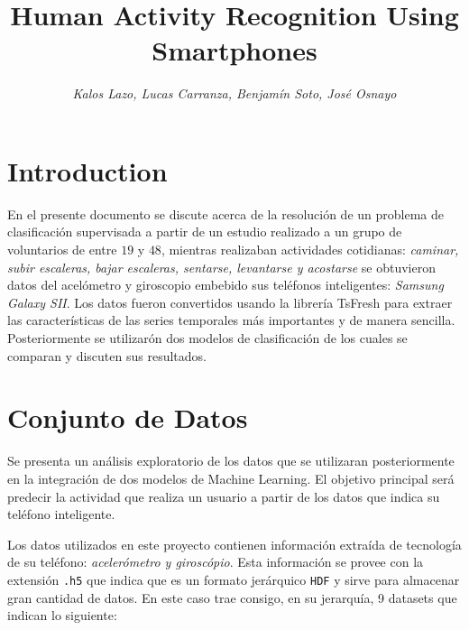 \documentclass[conference]{IEEEtran}
\begin{document}
    \title{Human Activity Recognition Using Smartphones\\}

    \author{\textit{Kalos Lazo, Lucas Carranza, Benjamín Soto, José Osnayo}}
\maketitle

\section{Introduction}
En el presente documento se discute acerca de la resolución de un problema de clasificación supervisada a partir de un estudio realizado a un grupo de voluntarios de entre $19$ y $48$, mientras realizaban actividades cotidianas: \textit{caminar, subir escaleras, bajar escaleras, sentarse, levantarse y acostarse} se obtuvieron datos del acelómetro y giroscopio embebido sus teléfonos inteligentes: \textit{Samsung Galaxy SII}. Los datos fueron convertidos usando la librería TsFresh para extraer las características de las series temporales más importantes y de manera sencilla. Posteriormente se utilizarón dos modelos de clasificación de los cuales se comparan y discuten sus resultados.

\section{Conjunto de Datos}
Se presenta un análisis exploratorio de los datos que se utilizaran posteriormente en la integración de dos modelos de Machine Learning. El objetivo principal será predecir la actividad que realiza un usuario a partir de los datos que indica su teléfono inteligente.

Los datos utilizados en este proyecto contienen información extraída de tecnología de su teléfono: \textit{acelerómetro y giroscópio}. Esta información se provee con la extensión \texttt{.h5} que indica que es un formato jerárquico \texttt{HDF} y sirve para almacenar gran cantidad de datos. En este caso trae consigo, en su jerarquía, 9 datasets que indican lo siguiente:
\end{document}
